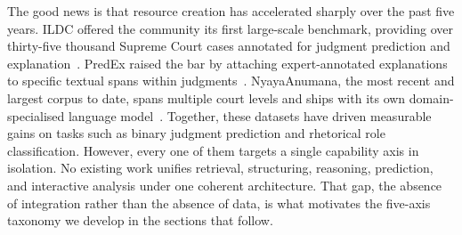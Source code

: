 The good news is that resource creation has accelerated sharply over the past five years. ILDC offered the community its first large-scale benchmark, providing over thirty-five thousand Supreme Court cases annotated for judgment prediction and explanation~\cite{malik-etal-2021-ildc}. PredEx raised the bar by attaching expert-annotated explanations to specific textual spans within judgments~\cite{nigam-etal-2024-predex}. NyayaAnumana, the most recent and largest corpus to date, spans multiple court levels and ships with its own domain-specialised language model~\cite{nigam-etal-2025-nyayaanumana}. Together, these datasets have driven measurable gains on tasks such as binary judgment prediction and rhetorical role classification. However, every one of them targets a single capability axis in isolation. No existing work unifies retrieval, structuring, reasoning, prediction, and interactive analysis under one coherent architecture. That gap, the absence of integration rather than the absence of data, is what motivates the five-axis taxonomy we develop in the sections that follow.
